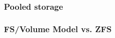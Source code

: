 % 
\begin{frame}[fragile]
    \frametitle{Pooled storage}
\end{frame}
% 
% 
\begin{frame}[fragile]
    \frametitle{FS/Volume Model vs. ZFS}
\end{frame}
% 
% 
% 
% 
